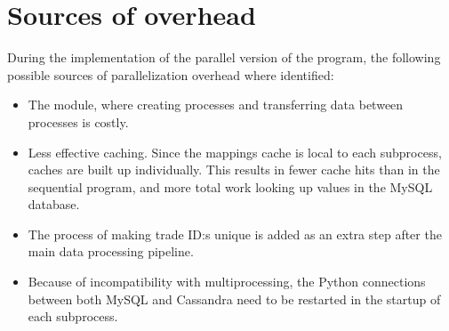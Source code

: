 \section{Sources of overhead}
During the implementation of the parallel version of the program, the following possible sources of parallelization overhead where identified:

\begin{itemize}
  \item The  module, where creating processes and transferring data between processes is costly.
  \item Less effective caching. Since the mappings cache is local to each subprocess, caches are built up individually. This results in fewer cache hits than in the sequential program, and more total work
    looking up values in the MySQL database.
  \item The process of making trade ID:s unique is added as an extra step after the main data processing pipeline.
  \item Because of incompatibility with multiprocessing, the Python connections between both MySQL and Cassandra need to be restarted in the startup of each subprocess.
\end{itemize}
